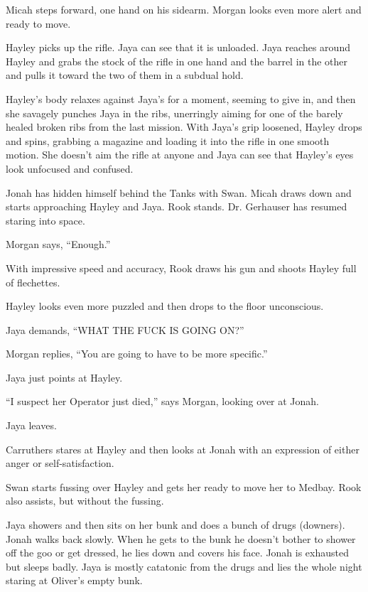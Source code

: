 Micah steps forward, one hand on his sidearm.  Morgan looks even more alert and ready to move.



Hayley picks up the rifle.  Jaya can see that it is unloaded.  Jaya reaches around Hayley and grabs the stock of the rifle in one hand and the barrel in the other and pulls it toward the two of them in a subdual hold.



Hayley's body relaxes against Jaya's for a moment, seeming to give in, and then she savagely punches Jaya in the ribs, unerringly aiming for one of the barely healed broken ribs from the last mission.  With Jaya's grip loosened, Hayley drops and spins, grabbing a magazine and loading it into the rifle in one smooth motion.  She doesn't aim the rifle at anyone and Jaya can see that Hayley's eyes look unfocused and confused.



Jonah has hidden himself behind the Tanks with Swan.  Micah draws down and starts approaching Hayley and Jaya.  Rook stands.  Dr. Gerhauser has resumed staring into space.



Morgan says, ``Enough.''

With impressive speed and accuracy, Rook draws his gun and shoots Hayley full of flechettes.

Hayley looks even more puzzled and then drops to the floor unconscious.



Jaya demands, ``WHAT THE FUCK IS GOING ON?''

Morgan replies, ``You are going to have to be more specific.''

Jaya just points at Hayley.

``I suspect her Operator just died,'' says Morgan, looking over at Jonah.

Jaya leaves.

Carruthers stares at Hayley and then looks at Jonah with an expression of either anger or self-satisfaction.

Swan starts fussing over Hayley and gets her ready to move her to Medbay.  Rook also assists, but without the fussing.





Jaya showers and then sits on her bunk and does a bunch of drugs (downers).  Jonah walks back slowly.  When he gets to the bunk he doesn't bother to shower off the goo or get dressed, he lies down and covers his face.  Jonah is exhausted but sleeps badly.  Jaya is mostly catatonic from the drugs and lies the whole night staring at Oliver's empty bunk.




